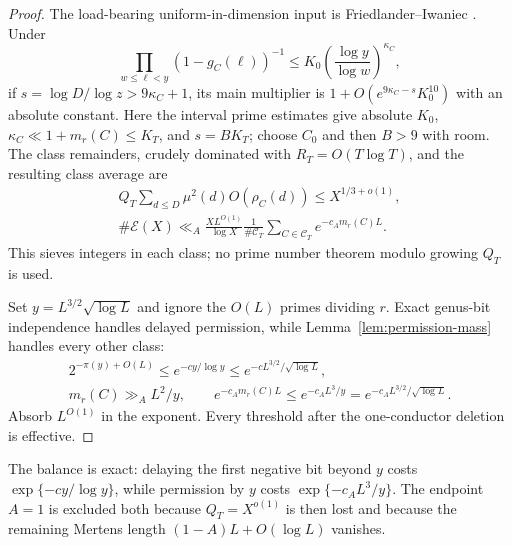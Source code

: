 \documentclass[10pt,reqno]{amsart}
\theoremstyle{definition}
\newcommand{\1}{\mathbf 1}
\begin{document}
\begin{proof}
The load-bearing uniform-in-dimension input is Friedlander--Iwaniec
\cite[Theorem~6.9]{FriedlanderIwaniec}.  Under
\begin{equation}\tag{53.31}
 \prod_{w\leq\ell<y}(1-g_C(\ell))^{-1}
 \leq K_0\left(\frac{\log y}{\log w}\right)^{\kappa_C},
\end{equation}
if $s=\log D/\log z>9\kappa_C+1$, its main multiplier is
$1+O(e^{9\kappa_C-s}K_0^{10})$ with an absolute constant.  Here the interval
prime estimates give absolute $K_0$, $\kappa_C\ll1+m_r(C)\leq K_T$, and
$s=BK_T$; choose $C_0$ and then $B>9$ with room.  The class remainders,
crudely dominated with $R_T=O(T\log T)$, and the resulting class average are
\begin{equation}\tag{53.32--53.33}
 \begin{gathered}
 Q_T\sum_{d\leq D}\mu^2(d)O(\rho_C(d))\leq X^{1/3+o(1)},\\
 \#\mathcal E(X)\ll_A\frac{XL^{O(1)}}{\log X}
 \frac1{\#\mathcal C_T}\sum_{C\in\mathcal C_T}e^{-c_A m_r(C)L}.
 \end{gathered}
\end{equation}
This sieves integers in each class; no prime number theorem modulo growing
$Q_T$ is used.

Set $y=L^{3/2}\sqrt{\log L}$ and ignore the $O(L)$ primes dividing $r$.
Exact genus-bit independence handles delayed permission, while
Lemma~\ref{lem:permission-mass} handles every other class:
\begin{equation}\tag{53.35--53.36}
 \begin{gathered}
 2^{-\pi(y)+O(L)}\leq e^{-cy/\log y}
 \leq e^{-cL^{3/2}/\sqrt{\log L}},\\
 m_r(C)\gg_A L^2/y,
 \qquad e^{-c_A m_r(C)L}\leq e^{-c_A L^3/y}
 =e^{-c_A L^{3/2}/\sqrt{\log L}}.
 \end{gathered}
\end{equation}
Absorb $L^{O(1)}$ in the exponent.  Every threshold after the one-conductor
deletion is effective.
\end{proof}
The balance is exact: delaying the first negative bit beyond $y$ costs
$\exp\{-cy/\log y\}$, while permission by $y$ costs
$\exp\{-c_A L^3/y\}$.  The endpoint $A=1$ is excluded both because
$Q_T=X^{o(1)}$ is then lost and because the remaining Mertens length
$(1-A)L+O(\log L)$ vanishes.
\end{document}
